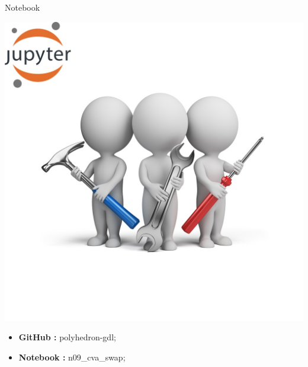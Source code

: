 \documentclass[11pt]{beamer}
\begin{document}
\begin{frame}{Notebook}
\noindent\begin{minipage}{0.5\textwidth}%
\includegraphics[width=\linewidth]{img/exercise.jpg}
\end{minipage}%
\hfill%
\begin{minipage}{0.5\textwidth}
\begin{itemize}
\item {\bf GitHub        : }    polyhedron-gdl;
\item {\bf Notebook   : }    n09\_cva\_swap;
\end{itemize}
\end{minipage}
\end{frame}
\end{document}

